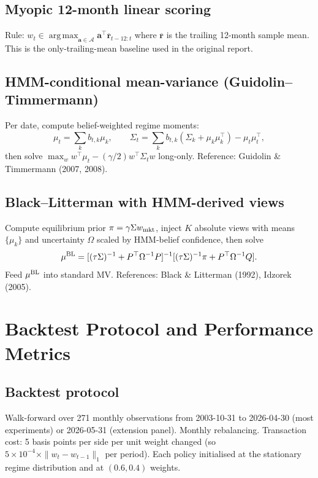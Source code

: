 \documentclass[11pt]{article}
\theoremstyle{plain1}
\theoremstyle{definition1}
\newcommand{\argmax}{\operatorname*{arg\,max}}
\newcommand{\1}{\mathbf{1}}
\newcommand{\action}{\mathcal{A}}
\begin{document}
\subsection{Myopic 12-month linear scoring}
Rule: $w_t \in \argmax_{\mathbf{a} \in \action} \mathbf{a}^\top \overline{\mathbf{r}}_{t-12:t}$ where $\overline{\mathbf{r}}$ is the trailing 12-month sample mean. This is the only-trailing-mean baseline used in the original report.

\subsection{HMM-conditional mean-variance (Guidolin--Timmermann)}
Per date, compute belief-weighted regime moments:
\[
\mu_t = \sum_k b_{t,k} \mu_k,\qquad
\Sigma_t = \sum_k b_{t,k} (\Sigma_k + \mu_k \mu_k^\top) - \mu_t \mu_t^\top,
\]
then solve $\max_w w^\top \mu_t - (\gamma/2) w^\top \Sigma_t w$ long-only. Reference: Guidolin \& Timmermann (2007, 2008).

\subsection{Black--Litterman with HMM-derived views}
Compute equilibrium prior $\pi = \gamma \Sigma w_{\rm mkt}$, inject $K$ absolute views with means $\{\mu_k\}$ and uncertainty $\Omega$ scaled by HMM-belief confidence, then solve
\[
\mu^{\rm BL} = [(\tau \Sigma)^{-1} + P^\top \Omega^{-1} P]^{-1} [(\tau \Sigma)^{-1} \pi + P^\top \Omega^{-1} Q].
\]
Feed $\mu^{\rm BL}$ into standard MV. References: Black \& Litterman (1992), Idzorek (2005).

\section{Backtest Protocol and Performance Metrics}\label{sec:protocol}

\subsection{Backtest protocol}

Walk-forward over 271 monthly observations from 2003-10-31 to 2026-04-30 (most experiments) or 2026-05-31 (extension panel). Monthly rebalancing. Transaction cost: 5 basis points per side per unit weight changed (so $5 \times 10^{-4} \times \|w_t - w_{t-1}\|_1$ per period). Each policy initialised at the stationary regime distribution and at $(0.6, 0.4)$ weights.
\end{document}
